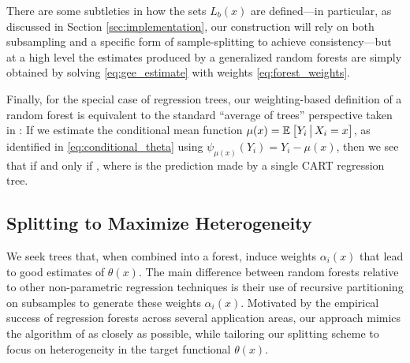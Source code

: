 \documentclass[aos]{imsart}
\theoremstyle{plain}
\theoremstyle{definition}
\theoremstyle{remark}
\begin{document}
\begin{CJK}{UTF8}{gbsn}
There are some subtleties in how the sets $L_b(x)$ are defined---in particular,
as discussed in Section \ref{sec:implementation}, our construction will rely on both
subsampling and a specific form of sample-splitting to achieve consistency---but at a high level
the estimates  produced by a generalized random forests are simply
obtained by solving \eqref{eq:gee_estimate} with weights \eqref{eq:forest_weights}.

Finally, for the special case of regression trees, our weighting-based definition of a random forest is equivalent
to the standard ``average of trees'' perspective taken in \citet{breiman2001random}:
If we estimate the conditional mean function $\mu(x) = \mathbb{E}_{}\left[Y_i \,\big|\, X_i = x\right]$, as
identified in \eqref{eq:conditional_theta} using
$\psi_{\mu(x)}(Y_i) = Y_i - \mu(x)$, then we see that
if and only if
,
where  is the
prediction made by a single CART regression tree.

\subsection{Splitting to Maximize Heterogeneity}

We seek trees that, when combined into a forest, induce weights
$\alpha_i(x)$ that lead to good estimates of $\theta(x)$. The main difference between
random forests relative to other non-parametric regression techniques
is their use of recursive partitioning on subsamples to generate these weights $\alpha_i(x)$.
Motivated by the empirical success of regression forests across several application areas, our approach
mimics the algorithm of \citet{breiman2001random} as closely as possible, while tailoring
our splitting scheme to focus on heterogeneity in the target functional $\theta(x)$.


\end{CJK}
\end{document}
